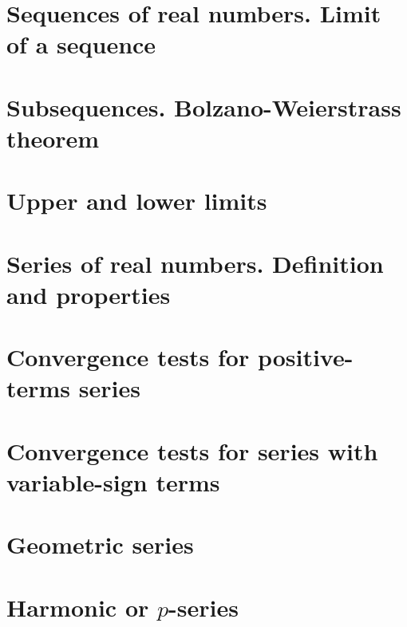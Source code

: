
\section{Sequences of real numbers. Limit of a sequence}

\section{Subsequences. Bolzano-Weierstrass theorem}

\section{Upper and lower limits}

\section{Series of real numbers. Definition and properties}

\section{Convergence tests for positive-terms series}

\section{Convergence tests for series with variable-sign terms}

\section{Geometric series}

\section{Harmonic or $p$-series}
